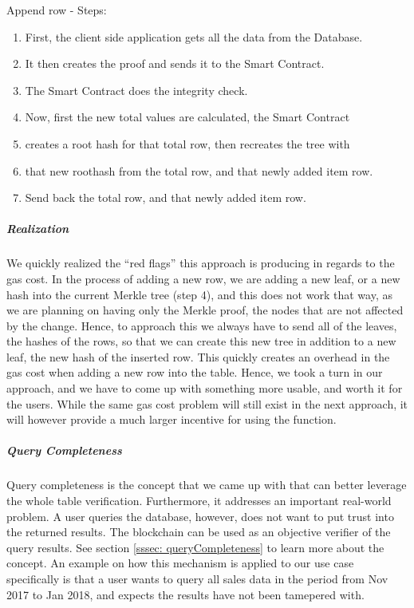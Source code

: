 Append row - Steps:
\begin{enumerate}
\item First, the client side application gets all the data from the Database.
\item It then creates the proof and sends it to the Smart Contract.
\item The Smart Contract does the integrity check. 
\item Now, first the new total values are calculated, the Smart Contract 
\item creates a root hash for that total row, then recreates the tree with 
\item that new roothash from the total row, and that newly added item row. 
\item Send back the total row, and that newly added item row. 
\end{enumerate}

\subparagraph{Realization}

We quickly realized the “red flags” this approach is producing in regards to the gas cost. In the process of adding a new row, we are adding a new leaf, or a new hash into the current Merkle tree (step 4), and this does not work that way, as we are planning on having only the Merkle proof, the nodes that are not affected by the change. Hence, to approach this we always have to send all of the leaves, the hashes of the rows, so that we can create this new tree in addition to a new leaf, the new hash of the inserted row. This quickly creates an overhead in the gas cost when adding a new row into the table. Hence, we took a turn in our approach, and we have to come up with something more usable, and worth it for the users. While the same gas cost problem will still exist in the next approach, it will however provide a much larger incentive for using the function. 

\subparagraph{Query Completeness}

Query completeness is the concept that we came up with that can better leverage the whole table verification. Furthermore, it addresses an important real-world problem. A user queries the database, however, does not want to put trust into the returned results. The blockchain can be used as an objective verifier of the query results. See section \ref{sssec: queryCompleteness} to learn more about the concept. An example on how this mechanism is applied to our use case specifically is that a user wants to query all sales data in the period from Nov 2017 to Jan 2018, and expects the results have not been tamepered with. 


